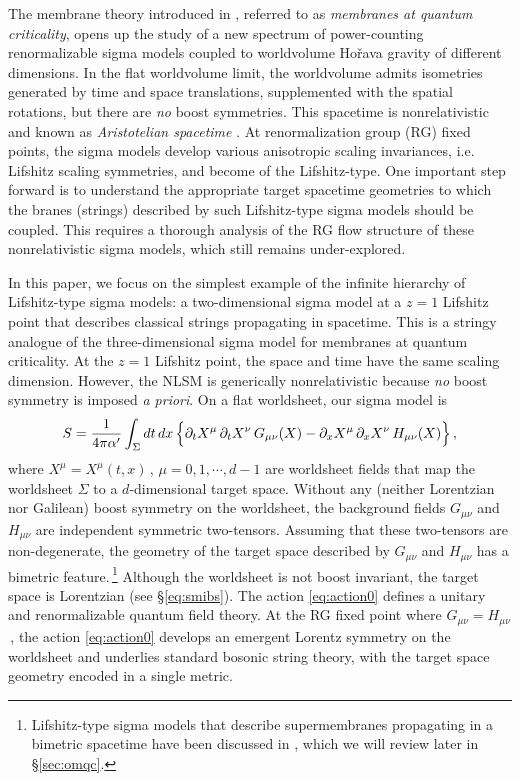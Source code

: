 \documentclass[11pt]{article}
\newcommand{\be}{\begin{equation}}
\newcommand{\ee}{\end{equation}}
\newcommand{\p}{\partial}
\begin{document}
The membrane theory introduced in \cite{Horava:2008ih}, referred to as \emph{membranes at quantum criticality}, opens up the study of a new spectrum of power-counting renormalizable sigma models coupled to worldvolume Ho\v{r}ava gravity of different dimensions. In the flat worldvolume limit, the worldvolume admits isometries generated by time and space translations, supplemented with the spatial rotations, but there are \emph{no} boost symmetries. This spacetime is nonrelativistic and known as \emph{Aristotelian spacetime} \cite{Penrose:1968ar, Grosvenor:2016gmj}. At renormalization group (RG) fixed points, the sigma models develop various anisotropic scaling invariances, i.e. Lifshitz scaling symmetries, and become of the Lifshitz-type. 
One important step forward is to understand the appropriate target spacetime geometries to which the branes (strings) described by such Lifshitz-type sigma models should be coupled. This requires a thorough analysis of the RG flow structure of these nonrelativistic sigma models, which still remains under-explored. 

In this paper, we focus on the simplest example of the infinite hierarchy of Lifshitz-type sigma models: a two-dimensional sigma model at a $z=1$ Lifshitz point that describes classical strings propagating in spacetime. This is a stringy analogue of the three-dimensional sigma model for membranes at quantum criticality. At the $z=1$ Lifshitz point, the space and time have the same scaling dimension. However, the NLSM is generically nonrelativistic because \emph{no} boost symmetry is imposed \emph{a priori}. On a flat worldsheet, our sigma model is
%
\be \label{eq:action0}
	S = \frac{1}{4\pi\alpha'} \int_\Sigma dt \, dx \, \Bigl\{ \p_t X^\mu \, \p_t X^\nu \, G_{\mu\nu} (X) - \p_x X^\mu \, \p_x X^\nu \, H_{\mu\nu} (X) \Bigr\}\,,
\ee
%
where $X^\mu = X^\mu (t, x)$\,, $\mu = 0, 1, \cdots, d-1$ are worldsheet fields that map the worldsheet $\Sigma$ to a $d$-dimensional target space. Without any (neither Lorentzian nor Galilean) boost symmetry on the worldsheet, the background fields $G_{\mu\nu}$ and $H_{\mu\nu}$ are independent symmetric two-tensors. Assuming that these two-tensors are non-degenerate, the geometry of the target space described by $G_{\mu\nu}$ and $H_{\mu\nu}$ has a bimetric feature.\,\footnote{Lifshitz-type sigma models that describe supermembranes propagating in a bimetric spacetime have been discussed in \cite{as}, which we will review later in \S\ref{sec:omqc}.} Although the worldsheet is not boost invariant, the target space is Lorentzian (see \S\ref{eq:smibs}). The action \eqref{eq:action0} defines a unitary and renormalizable quantum field theory. At the RG fixed point where $G_{\mu\nu} = H_{\mu\nu}$\,, the action \eqref{eq:action0} develops an emergent Lorentz symmetry on the worldsheet and underlies standard bosonic string theory, with the target space geometry encoded in a single metric.
\end{document}
